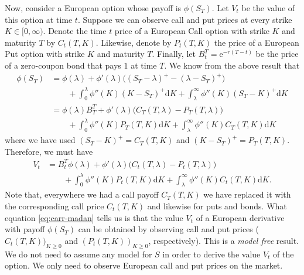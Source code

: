 \documentclass[12pt]{book}
\let\varphi\phi
\numberwithin{equation}{chapter}
\theoremstyle{plain}
\numberwithin{theorem}{section}
\theoremstyle{definition}
\numberwithin{exercise}{chapter}
\newcommand{\<}{\langle}
\renewcommand{\>}{\rangle}
\renewcommand{\(}{\left(}
\renewcommand{\)}{\right)}
\renewcommand{\[}{\left[}
\renewcommand{\]}{\right]}
\newcommand\lam{\lambda}
\newcommand\dd{\mathrm{d}}
\newcommand\ee{\mathrm{e}}
\newcommand{\blu}[1]{\textcolor{blue}{#1}}
\theoremstyle{definition}
\numberwithin{question}{section}
\begin{document}
\noindent
Now, consider a European option whose payoff is $\varphi(S_T)$.  Let $V_t$ be the value of this option at time $t$.  Suppose we can observe call and put prices at every strike $K \in [0,\infty)$.  Denote the time $t$ price of a European Call option with strike $K$ and maturity $T$ by $C_t(T,K)$.  Likewise, denote by $P_t(T,K)$ the price of a European Put option with strike $K$ and maturity $T$.  Finally, let $B_t^T = \ee^{-r(T-t)}$ be the price of a zero-coupon bond that pays $1$ at time $T$.  
We know from the above result that
\begin{align}
\varphi(S_T)
	&=	\varphi(\lambda)  + \varphi'(\lambda) \Big( (S_T-\lambda)^+ - (\lambda - S_T)^+ \Big) \\ &\qquad
			+ \int_0^\lambda \varphi''(K) (K-S_T)^+ \dd K + \int_\lambda^\infty \varphi''(K) (S_T-K)^+ \dd K \\
	&=	\varphi(\lambda) B_T^T + \varphi'(\lambda) \Big( C_T(T,\lam) - P_T(T,\lam) \Big) \\ &\qquad
			+ \int_0^\lambda \varphi''(K) P_T(T,K) \dd K + \int_\lambda^\infty \varphi''(K) C_T(T,K) \dd K
\end{align}
where we have used $(S_T-K)^+ = C_T(T,K)$ and $(K-S_T)^+ = P_T(T,K)$.  Therefore, we must have
\begin{align}
V_t
	&=	B_t^T \varphi(\lambda) + \varphi'(\lambda) \Big( C_t(T,\lam) - P_t(T,\lam) \Big) \\ &\qquad
			+ \int_0^\lambda \varphi''(K) P_t(T,K) \dd K + \int_\lambda^\infty \varphi''(K) C_t(T,K) \dd K . \label{eq:carr-madan}
\end{align}
Note that, everywhere we had a call payoff $C_T(T,K)$ we have replaced it with the corresponding call price $C_t(T,K)$ and likewise for puts and bonds.  What equation \eqref{eq:carr-madan} tells us is that the value $V_t$ of a European derivative with payoff $\varphi(S_T)$ can be obtained by observing call and put prices ($C_t(T,K))_{K \geq 0}$ and $(P_t(T,K))_{K \geq 0}$, respectively).  This is a \textit{model free} result.  We do not need to assume any model for $S$ in order to derive the value $V_t$ of the option.  We only need to observe European call and put prices on the market.
\end{document}

